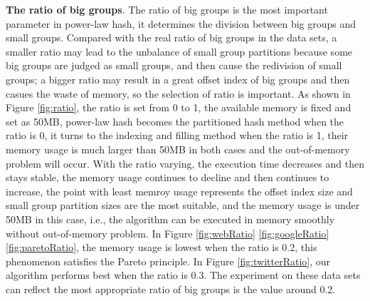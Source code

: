 \textbf{The ratio of big groups}. The ratio of big groups is the most important parameter in power-law hash, it determines the division between big groups and small groups. Compared with the real ratio of big groups in the data sets, a smaller ratio may lead to the unbalance of small group partitions because some big groups are judged as small groups, and then cause the redivision of small groups; a bigger ratio may result in a great offset index of big groups and then casues the waste of memory, so the selection of ratio is important. As shown in Figure \ref{fig:ratio}, the ratio is set from 0 to 1, the available memory is fixed and set as 50MB, power-law hash becomes the partitioned hash method when the ratio is 0, it turns to the indexing and filling method when the ratio is 1, their memory usage is much larger than 50MB in both cases and the out-of-memory problem will occur. With the ratio varying, the execution time decreases and then stays stable, the memory usage continues to decline and then continues to increase, the point with least memroy usage represents the offset index size and small group partition sizes are the most suitable, and the memory usage is under 50MB in this case, i.e., the algorithm can be executed in memory smoothly without out-of-memory problem. In Figure \ref{fig:webRatio} \ref{fig:googleRatio} \ref{fig:paretoRatio}, the memory usage is lowest when the ratio is 0.2, this phenomenon satisfies the Pareto principle. In Figure \ref{fig:twitterRatio}, our algorithm performs best when the ratio is 0.3. The experiment on these data sets can reflect the most appropriate ratio of big groups is the value around 0.2.
 
